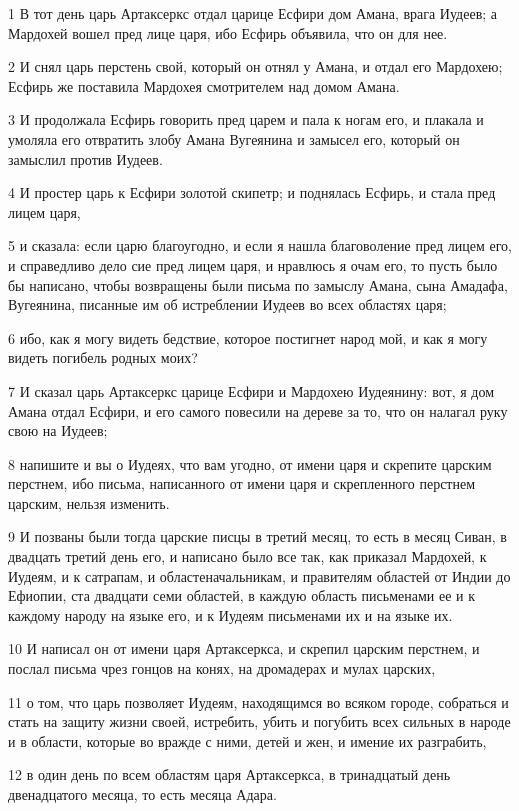 \par 1 В тот день царь Артаксеркс отдал царице Есфири дом Амана, врага Иудеев; а Мардохей вошел пред лице царя, ибо Есфирь объявила, что он для нее.
\par 2 И снял царь перстень свой, который он отнял у Амана, и отдал его Мардохею; Есфирь же поставила Мардохея смотрителем над домом Амана.
\par 3 И продолжала Есфирь говорить пред царем и пала к ногам его, и плакала и умоляла его отвратить злобу Амана Вугеянина и замысел его, который он замыслил против Иудеев.
\par 4 И простер царь к Есфири золотой скипетр; и поднялась Есфирь, и стала пред лицем царя,
\par 5 и сказала: если царю благоугодно, и если я нашла благоволение пред лицем его, и справедливо дело сие пред лицем царя, и нравлюсь я очам его, то пусть было бы написано, чтобы возвращены были письма по замыслу Амана, сына Амадафа, Вугеянина, писанные им об истреблении Иудеев во всех областях царя;
\par 6 ибо, как я могу видеть бедствие, которое постигнет народ мой, и как я могу видеть погибель родных моих?
\par 7 И сказал царь Артаксеркс царице Есфири и Мардохею Иудеянину: вот, я дом Амана отдал Есфири, и его самого повесили на дереве за то, что он налагал руку свою на Иудеев;
\par 8 напишите и вы о Иудеях, что вам угодно, от имени царя и скрепите царским перстнем, ибо письма, написанного от имени царя и скрепленного перстнем царским, нельзя изменить.
\par 9 И позваны были тогда царские писцы в третий месяц, то есть в месяц Сиван, в двадцать третий день его, и написано было все так, как приказал Мардохей, к Иудеям, и к сатрапам, и областеначальникам, и правителям областей от Индии до Ефиопии, ста двадцати семи областей, в каждую область письменами ее и к каждому народу на языке его, и к Иудеям письменами их и на языке их.
\par 10 И написал он от имени царя Артаксеркса, и скрепил царским перстнем, и послал письма чрез гонцов на конях, на дромадерах и мулах царских,
\par 11 о том, что царь позволяет Иудеям, находящимся во всяком городе, собраться и стать на защиту жизни своей, истребить, убить и погубить всех сильных в народе и в области, которые во вражде с ними, детей и жен, и имение их разграбить,
\par 12 в один день по всем областям царя Артаксеркса, в тринадцатый день двенадцатого месяца, то есть месяца Адара.
